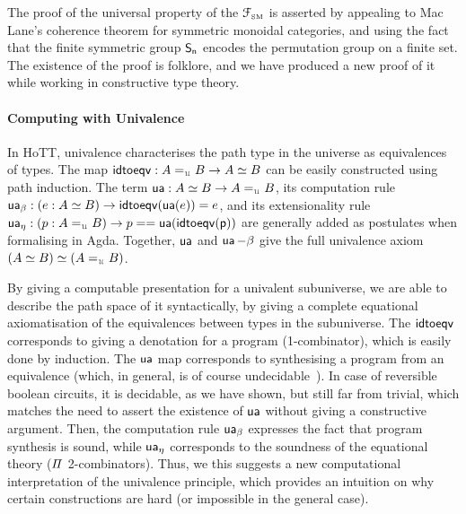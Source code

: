 The proof of the universal property of the $\FSM$ is asserted by appealing to Mac Lane's coherence theorem for symmetric
monoidal categories, and using the fact that the finite symmetric group $\Sn$ encodes the permutation group on a finite
set. The existence of the proof is folklore, and we have produced a new proof of it while working in constructive type
theory.

\paragraph{Computing with Univalence} In HoTT, univalence characterises the path type in the universe as equivalences of
types. The map $\term{idtoeqv} : A \id_{\UU} B \to A \eqv B$ can be easily constructed using path induction. The term
$\term{ua} : A \eqv B \to A \id_{\UU} B$, its computation rule $\term{ua_\beta} : (e : A \eqv B) \to
    \term{idtoeqv}(\term{ua}(e)) \id e$, and its extensionality rule $\term{ua_\eta} : (p : A \id_{\UU} B) \to p ==
    \term{ua}(\term{idtoeqv(p)})$ are generally added as postulates when formalising in Agda. Together, $\operatorname{\mathsf{ua}}$ and
$\operatorname{\mathsf{ua}}-\beta$ give the full univalence axiom $(A \eqv B) \eqv (A \id_{\UU} B)$.


By giving a computable presentation for a univalent subuniverse, we are able to describe the path space of it
syntactically, by giving a complete equational axiomatisation of the equivalences between types in the subuniverse.
The $\operatorname{\mathsf{idtoeqv}}$ corresponds to giving a denotation for a program (1-combinator), which is easily done by induction.
The $\operatorname{\mathsf{ua}}$ map corresponds to synthesising a program from an equivalence (which, in general, is of course
undecidable~\cite{krogmeierDecidableSynthesisPrograms2020}). In case of reversible boolean circuits, it is decidable, as
we have shown, but still far from trivial, which matches the need to assert the existence of $\operatorname{\mathsf{ua}}$ without giving
a constructive argument. Then, the computation rule $\operatorname{\mathsf{ua_\beta}}$ expresses the fact that program synthesis is
sound, while $\operatorname{\mathsf{ua_\eta}}$ corresponds to the soundness of the equational theory ($\mathit{\Pi}$ 2-combinators). Thus, we
this suggests a new computational interpretation of the univalence principle, which provides an intuition on why certain
constructions are hard (or impossible in the general case).

